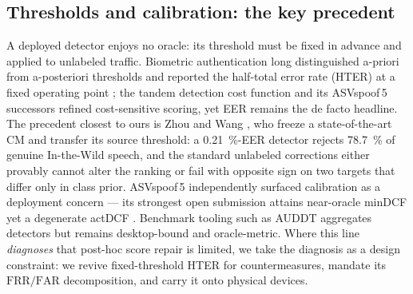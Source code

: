 \documentclass[journal]{IEEEtran}
\newcommand{\frr}{\mathrm{FRR}}
\newcommand{\far}{\mathrm{FAR}}
\begin{document}
\subsection{Thresholds and calibration: the key precedent}
A deployed detector enjoys no oracle: its threshold must be fixed in advance and
applied to unlabeled traffic. Biometric authentication long distinguished
a-priori from a-posteriori thresholds and reported the half-total error rate
(HTER) at a fixed operating point \cite{bengio04_hter}; the tandem detection cost
function \cite{kinnunen18_tdcf} and its ASVspoof\,5 successors refined
cost-sensitive scoring, yet EER remains the de facto headline. The precedent
closest to ours is Zhou and Wang \cite{zhou26_eer_hides}, who freeze a
state-of-the-art CM and transfer its source threshold: a \SI{0.21}{\percent}-EER
detector rejects \SI{78.7}{\percent} of genuine In-the-Wild speech, and the
standard unlabeled corrections either provably cannot alter the ranking or fail
with opposite sign on two targets that differ only in class prior. ASVspoof\,5
independently surfaced calibration as a deployment concern --- its strongest open
submission attains near-oracle minDCF yet a degenerate actDCF
\cite{wang24_asvspoof5}. Benchmark tooling such as AUDDT \cite{auddt25}
aggregates detectors but remains desktop-bound and oracle-metric. Where this line
\emph{diagnoses} that post-hoc score repair is limited, we take the diagnosis as
a design constraint: we revive fixed-threshold HTER for countermeasures,
mandate its \(\frr/\far\) decomposition, and carry it onto physical devices.
\end{document}
